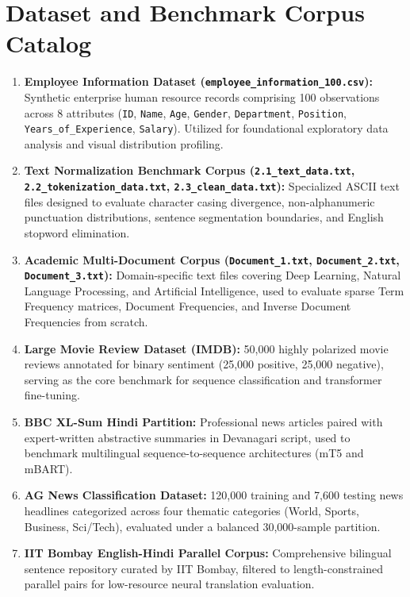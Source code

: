 \chapter{Dataset and Benchmark Corpus Catalog}
\begin{enumerate}
    \item \textbf{Employee Information Dataset (\texttt{employee\_information\_100.csv}):} Synthetic enterprise human resource records comprising 100 observations across 8 attributes (\texttt{ID}, \texttt{Name}, \texttt{Age}, \texttt{Gender}, \texttt{Department}, \texttt{Position}, \texttt{Years\_of\_Experience}, \texttt{Salary}). Utilized for foundational exploratory data analysis and visual distribution profiling.
    \item \textbf{Text Normalization Benchmark Corpus (\texttt{2.1\_text\_data.txt}, \texttt{2.2\_tokenization\_data.txt}, \texttt{2.3\_clean\_data.txt}):} Specialized ASCII text files designed to evaluate character casing divergence, non-alphanumeric punctuation distributions, sentence segmentation boundaries, and English stopword elimination.
    \item \textbf{Academic Multi-Document Corpus (\texttt{Document\_1.txt}, \texttt{Document\_2.txt}, \texttt{Document\_3.txt}):} Domain-specific text files covering Deep Learning, Natural Language Processing, and Artificial Intelligence, used to evaluate sparse Term Frequency matrices, Document Frequencies, and Inverse Document Frequencies from scratch.
    \item \textbf{Large Movie Review Dataset (IMDB):} 50,000 highly polarized movie reviews annotated for binary sentiment (25,000 positive, 25,000 negative), serving as the core benchmark for sequence classification and transformer fine-tuning.
    \item \textbf{BBC XL-Sum Hindi Partition:} Professional news articles paired with expert-written abstractive summaries in Devanagari script, used to benchmark multilingual sequence-to-sequence architectures (mT5 and mBART).
    \item \textbf{AG News Classification Dataset:} 120,000 training and 7,600 testing news headlines categorized across four thematic categories (World, Sports, Business, Sci/Tech), evaluated under a balanced 30,000-sample partition.
    \item \textbf{IIT Bombay English-Hindi Parallel Corpus:} Comprehensive bilingual sentence repository curated by IIT Bombay, filtered to length-constrained parallel pairs for low-resource neural translation evaluation.
\end{enumerate}


